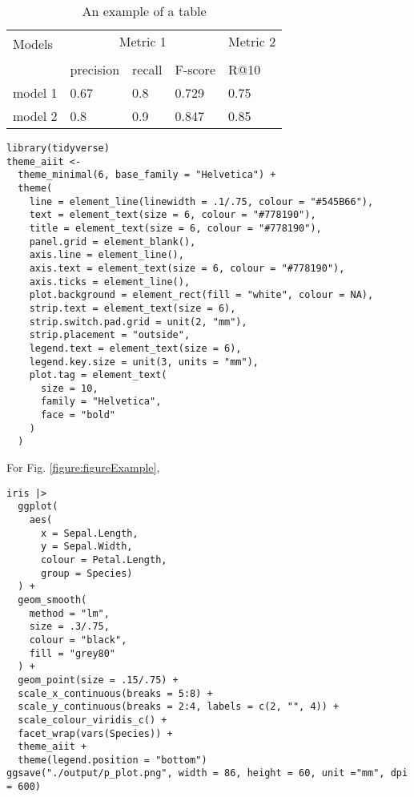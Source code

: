 \documentclass[a4paper, 9pt, twocolumn]{extarticle}
\begin{document}
\begin{table}[hbt!]
 \caption{An example of a table}
 \label{table:tableExample}
 \centering
    \begin{tabular}{lllll}
        \toprule
        \multirow{2}{*}{Models} & \multicolumn{3}{c}{Metric 1} & Metric 2\\
        \cmidrule{2-4} \cmidrule{5-5} \\
        {} & precision & recall & F-score  & R@10 \\
        \midrule
        model 1 & 0.67  & 0.8 & 0.729  & 0.75 \\
        model 2 & 0.8 & 0.9 & 0.847 & 0.85 \\
        \bottomrule
    \end{tabular}
\end{table}



\begin{verbatim}
library(tidyverse)
theme_aiit <- 
  theme_minimal(6, base_family = "Helvetica") +
  theme(
    line = element_line(linewidth = .1/.75, colour = "#545B66"),
    text = element_text(size = 6, colour = "#778190"),
    title = element_text(size = 6, colour = "#778190"),
    panel.grid = element_blank(),
    axis.line = element_line(),
    axis.text = element_text(size = 6, colour = "#778190"),
    axis.ticks = element_line(),
    plot.background = element_rect(fill = "white", colour = NA),
    strip.text = element_text(size = 6),
    strip.switch.pad.grid = unit(2, "mm"),
    strip.placement = "outside",
    legend.text = element_text(size = 6),
    legend.key.size = unit(3, units = "mm"),
    plot.tag = element_text(
      size = 10, 
      family = "Helvetica", 
      face = "bold"
    )
  )
\end{verbatim}
For Fig. \ref{figure:figureExample},

\begin{verbatim}
iris |> 
  ggplot(
    aes(
      x = Sepal.Length, 
      y = Sepal.Width, 
      colour = Petal.Length, 
      group = Species)
  ) +
  geom_smooth(
    method = "lm", 
    size = .3/.75, 
    colour = "black", 
    fill = "grey80"
  ) +
  geom_point(size = .15/.75) +
  scale_x_continuous(breaks = 5:8) +
  scale_y_continuous(breaks = 2:4, labels = c(2, "", 4)) +
  scale_colour_viridis_c() +
  facet_wrap(vars(Species)) +
  theme_aiit +
  theme(legend.position = "bottom")
ggsave("./output/p_plot.png", width = 86, height = 60, unit ="mm", dpi = 600)
\end{verbatim}
\end{document}
